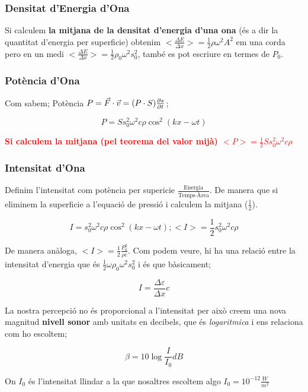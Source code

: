 \documentclass[12pt]{article}
\begin{document}
\subsubsection{Densitat d'Energia d'Ona}

Si calculem \textbf{la mitjana de la densitat d'energia d'una ona} (és a dir la quantitat d'energia per superficie) obtenim $<\frac{\Delta E}{\Delta x}> = \frac{1}{2}\rho \omega^2 A^2$ em una corda pero en un medi $<\frac{\Delta E}{\Delta x}> = \frac{1}{2}\rho_0 \omega^2 s_0^2$, també es pot escriure en termes de $P_0$.

\subsubsection{Potència d'Ona}

Com sabem; Potència $P = \vec{F} \cdot \vec{v} = (P\cdot S) \pdv{s}{t}$;

\[P = S s_0^2 \omega^2 c \rho \cos^2(kx-\omega t)\]

\textcolor{red}{\textbf{Si calculem la mitjana (pel teorema del valor mijà) $<P> = \frac{1}{2} S s_0^2 \omega^2 c \rho$}}

\subsubsection{Intensitat d'Ona}

Definim l'intensitat com potència per supericie $\frac{\text{Energia}}{\text{Temps} \cdot \text{Àrea}}$. De manera que si eliminem la superficie a l'equació de pressió i calculem la mitjana ($\frac{1}{2}$). 

\[I = s_0^2 \omega^2 c\rho \cos^2(kx-\omega t); <I> = \frac{1}{2} s_0^2 \omega^2c\rho\]

De manera anàloga, $<I> = \frac{1}{2} \frac{P_0^2}{\rho c}$. Com podem veure, hi ha una relació entre la intensitat d'energia que és $\frac{1}{2} \omega \rho_0 \omega^2 s_0^2$ i és que bàsicament;

\[\boxed{I = \frac{\Delta \varepsilon}{\Delta x}c}\]

La nostra percepció no és proporcional a l'intensitat per això creem una nova magnitud \textbf{nivell sonor} amb unitats en decibels, que és \textit{logaritmica} i ens relaciona com ho escoltem;

\[\beta = 10 \log \frac{I}{I_0}dB\] 

On $I_0$ és l'intensitat llindar a la que nosaltres escoltem algo $I_0 = 10^{-12} \frac{W}{m^2}$
\end{document}
